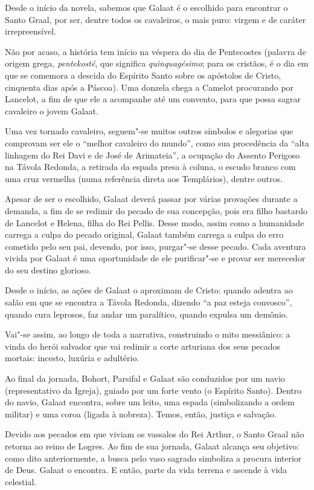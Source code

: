 \documentclass{extarticle}
\begin{document}
Desde o início da novela, sabemos que Galaat é o escolhido para
encontrar o Santo Graal, por ser, dentre todos os cavaleiros, o mais
puro: virgem e de caráter
irrepreensível.

Não por acaso, a história tem início na véspera
do dia de Pentecostes (palavra de origem grega, \emph{pentekosté}, que
significa \emph{quinquagésimo}; para os cristãos, é o dia em que se
comemora a descida do Espírito Santo sobre os apóstolos de Cristo,
cinquenta dias após a Páscoa). Uma donzela chega a Camelot procurando
por Lancelot, a fim de que ele a acompanhe até um convento, para que
possa sagrar cavaleiro o jovem
Galaat.

Uma vez tornado cavaleiro, seguem"-se muitos outros símbolos e
alegorias que comprovam ser ele o ``melhor cavaleiro do mundo'', como
sua procedência da ``alta linhagem do Rei Davi e de José de Arimateia'',
a ocupação do Assento Perigoso na Távola Redonda, a retirada da espada
presa à coluna, o escudo branco com uma cruz vermelha (numa referência
direta aos Templários), dentre outros.

Apesar de ser o escolhido, Galaat deverá passar por várias
provações durante a demanda, a fim de se redimir do pecado de sua
concepção, pois era filho bastardo de Lancelot e Helena, filha do Rei
Pellis. Desse modo, assim como a humanidade carrega a culpa do pecado
original, Galaat também carrega a culpa do erro cometido pelo seu pai,
devendo, por isso, purgar"-se desse pecado. Cada aventura vivida por
Galaat é uma oportunidade de ele purificar"-se e provar ser merecedor do
seu destino glorioso.

Desde o início, as ações de Galaat o aproximam de Cristo:
quando adentra ao salão em que se encontra a Távola Redonda, dizendo ``a
paz esteja convosco'', quando cura leprosos, faz andar um paralítico,
quando expulsa um demônio.

Vai"-se assim, ao longo de toda a narrativa, construindo o mito
messiânico: a vinda do herói salvador que vai redimir a corte arturiana
dos seus pecados mortais: incesto, luxúria e
adultério.

Ao final da jornada, Bohort, Parsifal e Galaat são conduzidos
por um navio (representativo da Igreja), guiado por um forte vento (o
Espírito Santo). Dentro do navio, Galaat encontra, sobre um leito, uma
espada (simbolizando a ordem militar) e uma coroa (ligada à nobreza).
Temos, então, justiça e
salvação.

Devido aos pecados em que viviam os vassalos do Rei Arthur, o
Santo Graal não retorna ao reino de Logres. Ao fim de sua jornada,
Galaat alcança seu objetivo: como dito anteriormente, a busca pelo vaso
sagrado simboliza a procura interior de Deus. Galaat o encontra. E
então, parte da vida terrena e ascende à vida
celestial.
\end{document}
